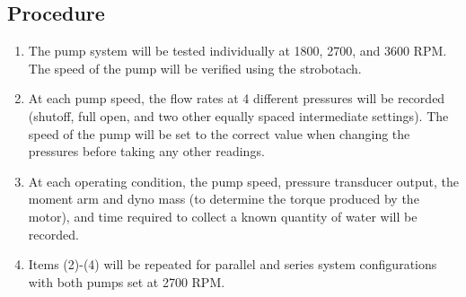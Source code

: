 \subsection{Procedure}
\begin{enumerate}
    \item The pump system will be tested individually at 1800, 2700, and 3600 RPM. The speed of the pump will be verified using the strobotach.
    \item At each pump speed, the flow rates at 4 different pressures will be recorded (shutoff, full open, and two other equally spaced intermediate settings). The speed of the pump will be set to the correct value when changing the pressures before taking any other readings.
    \item At each operating condition, the pump speed, pressure transducer output, the moment arm and dyno mass (to determine the torque produced by the motor), and time required to collect a known quantity of water will be recorded.
    \item Items (2)-(4) will be repeated for parallel and series system configurations with both pumps set at 2700 RPM.
\end{enumerate} 